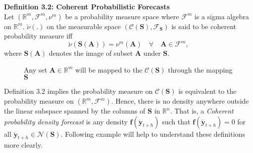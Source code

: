 \documentclass[a4paper, 11pt]{article}
\begin{document}
\noindent
\textbf{Definition 3.2: Coherent Probabilistic Forecasts}\\
\noindent
Let $(\bm{\mathbb{R}}^m, \bm{\mathscr{F}}^m, \nu^m)$ be a probability measure space where $\mathscr{F}^m$ is a sigma algebra on $\bm{\mathbb{R}}^m$. $\breve{\nu}(.)$ on the measurable space $(\mathscr{C}(\bm{S}), \mathscr{F}_{\bm{S}})$ is said to be coherent probability measure iff $$\breve{\nu}(\bm{S}(\bm{A})) = \nu^m(\bm{A}) \quad \forall \quad \bm{A} \in \mathscr{F}^m,$$ where $\bm{S}(\bm{A})$ denotes the image of subset $\bm{A}$ under $\bm{S}$. 

\usetikzlibrary{arrows,positioning,shapes,fit,calc}

\begin{figure}[H]
	\begin{center}
		\newline
	\end{center}
	\caption{Any set $\bm{A} \in \bm{\mathbb{R}}^m$ will be mapped to the $\mathscr{C}(\bm{S})$ through the mapping $\bm{S}$}
\end{figure}
\noindent
Definition 3.2 implies the probability measure on $\mathscr{C}(\bm{S})$ is equivalent to the probability measure on $(\bm{\mathbb{R}}^m, \bm{\mathscr{F}}^m)$. Hence, there is no density anywhere outside the linear subspace spanned by the columns of $\bm{S}$ in $\bm{\mathbb{R}}^n$. That is, a \textit{Coherent probability density forecast} is any density $\bm{f}(\bm{\breve{y}}_{t+h})$ such that $\bm{f}(\bm{\breve{y}}_{t+h})=0$ for all $\bm{\breve{y}}_{t+h} \in \mathscr{N}(\bm{S})$. Following example will help to understand these definitions more clearly.\\
\end{document}
